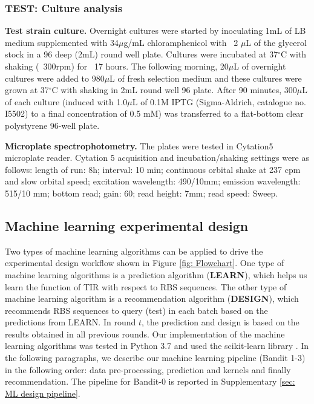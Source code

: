 \subsubsection{TEST: Culture analysis}

\textbf{Test strain culture.}
Overnight cultures were started by inoculating 1mL of LB medium supplemented with 34$\mu$g/mL chloramphenicol with ~2 $\mu$L of the glycerol stock in a 96 deep (2mL) round well plate.
Cultures were incubated at 37$^{\circ}$C with shaking (~300rpm) for ~17 hours. 
The following morning, 20$\mu$L of overnight cultures were added to 980$\mu$L of fresh selection medium and these cultures were grown at 37$^{\circ}$C with shaking in 2mL round well 96 plate. 
After 90 minutes, 300$\mu$L of each culture (induced with 1.0$\mu$L of 0.1M IPTG (Sigma-Aldrich, catalogue no. I5502) to a final concentration of 0.5 mM) was transferred to a flat-bottom clear polystyrene 96-well plate.

\textbf{Microplate spectrophotometry.}
The plates were tested in Cytation5 microplate reader.
Cytation 5 acquisition and incubation/shaking settings were as follows: length of run: 8h; interval: 10 min; continuous orbital shake at 237 cpm and slow orbital speed; excitation wavelength: 490/10mm; emission wavelength: 515/10 mm; bottom read; gain: 60; read height: 7mm; read speed: Sweep.

\subsection{Machine learning experimental design}

Two types of machine learning algorithms can be applied to drive the experimental design workflow shown in Figure \ref{fig: Flowchart}.
One type of machine learning algorithms is a prediction algorithm (\textbf{LEARN}), which helps us learn the function of TIR with respect to RBS sequences. The other type of machine learning algorithm is a recommendation algorithm (\textbf{DESIGN}), which recommends RBS sequences to query (test) in each batch based on the predictions from LEARN. 
In round $t$, the prediction and design is based on the results obtained in all previous rounds. 
Our implementation of the machine learning algorithms was tested in Python 3.7 and used the scikit-learn library \cite{scikit-learn}. 
In the following paragraphs, we describe our machine learning pipeline (Bandit 1-3) in the following order: data pre-processing, prediction and kernels and finally recommendation. 
The pipeline for Bandit-0 is reported in Supplementary \ref{sec: ML design pipeline}.

